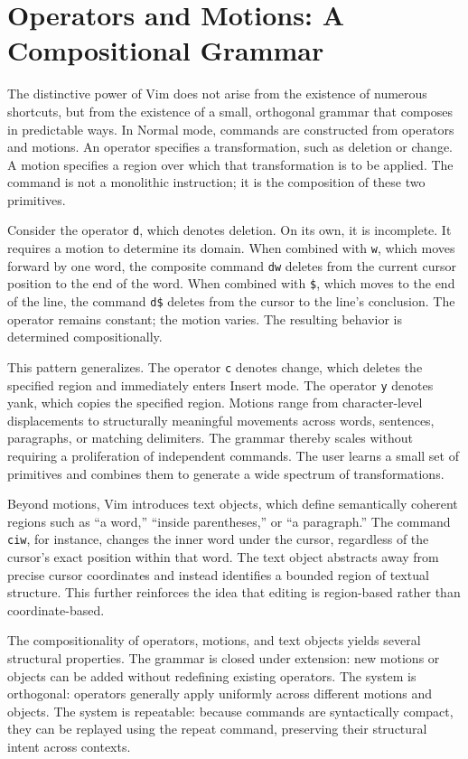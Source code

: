 \documentclass[12pt]{article}
\begin{document}
\section{Operators and Motions: A Compositional Grammar}

The distinctive power of Vim does not arise from the existence of numerous shortcuts, but from the existence of a small, orthogonal grammar that composes in predictable ways. In Normal mode, commands are constructed from operators and motions. An operator specifies a transformation, such as deletion or change. A motion specifies a region over which that transformation is to be applied. The command is not a monolithic instruction; it is the composition of these two primitives.

Consider the operator \texttt{d}, which denotes deletion. On its own, it is incomplete. It requires a motion to determine its domain. When combined with \texttt{w}, which moves forward by one word, the composite command \texttt{dw} deletes from the current cursor position to the end of the word. When combined with \texttt{\$}, which moves to the end of the line, the command \texttt{d\$} deletes from the cursor to the line’s conclusion. The operator remains constant; the motion varies. The resulting behavior is determined compositionally.

This pattern generalizes. The operator \texttt{c} denotes change, which deletes the specified region and immediately enters Insert mode. The operator \texttt{y} denotes yank, which copies the specified region. Motions range from character-level displacements to structurally meaningful movements across words, sentences, paragraphs, or matching delimiters. The grammar thereby scales without requiring a proliferation of independent commands. The user learns a small set of primitives and combines them to generate a wide spectrum of transformations.

Beyond motions, Vim introduces text objects, which define semantically coherent regions such as “a word,” “inside parentheses,” or “a paragraph.” The command \texttt{ciw}, for instance, changes the inner word under the cursor, regardless of the cursor’s exact position within that word. The text object abstracts away from precise cursor coordinates and instead identifies a bounded region of textual structure. This further reinforces the idea that editing is region-based rather than coordinate-based.

The compositionality of operators, motions, and text objects yields several structural properties. The grammar is closed under extension: new motions or objects can be added without redefining existing operators. The system is orthogonal: operators generally apply uniformly across different motions and objects. The system is repeatable: because commands are syntactically compact, they can be replayed using the repeat command, preserving their structural intent across contexts.
\end{document}
